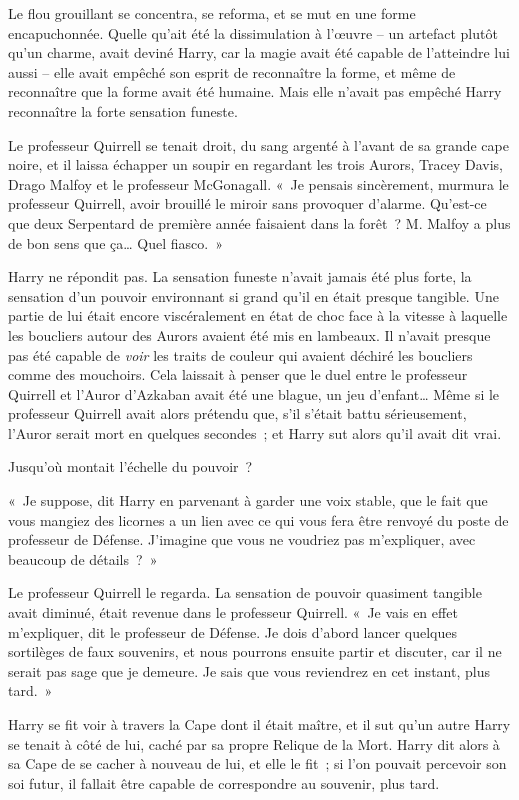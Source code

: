 Le flou grouillant se concentra, se reforma, et se mut en une forme encapuchonnée. Quelle qu'ait été la dissimulation à l'œuvre -- un artefact plutôt qu'un charme, avait deviné Harry, car la magie avait été capable de l'atteindre lui aussi -- elle avait empêché son esprit de reconnaître la forme, et même de reconnaître que la forme avait été humaine. Mais elle n'avait pas empêché Harry reconnaître la forte sensation funeste.

Le professeur Quirrell se tenait droit, du sang argenté à l'avant de sa grande cape noire, et il laissa échapper un soupir en regardant les trois Aurors, Tracey Davis, Drago Malfoy et le professeur McGonagall. «~Je pensais sincèrement, murmura le professeur Quirrell, avoir brouillé le miroir sans provoquer d'alarme. Qu'est-ce que deux Serpentard de première année faisaient dans la forêt~? M. Malfoy a plus de bon sens que ça… Quel fiasco.~»

Harry ne répondit pas. La sensation funeste n'avait jamais été plus forte, la sensation d'un pouvoir environnant si grand qu'il en était presque tangible. Une partie de lui était encore viscéralement en état de choc face à la vitesse à laquelle les boucliers autour des Aurors avaient été mis en lambeaux. Il n'avait presque pas été capable de \emph{voir} les traits de couleur qui avaient déchiré les boucliers comme des mouchoirs. Cela laissait à penser que le duel entre le professeur Quirrell et l'Auror d'Azkaban avait été une blague, un jeu d'enfant… Même si le professeur Quirrell avait alors prétendu que, s'il s'était battu sérieusement, l'Auror serait mort en quelques secondes~; et Harry sut alors qu'il avait dit vrai.

Jusqu'où montait l'échelle du pouvoir~?

«~Je suppose, dit Harry en parvenant à garder une voix stable, que le fait que vous mangiez des licornes a un lien avec ce qui vous fera être renvoyé du poste de professeur de Défense. J'imagine que vous ne voudriez pas m'expliquer, avec beaucoup de détails~?~»

Le professeur Quirrell le regarda. La sensation de pouvoir quasiment tangible avait diminué, était revenue dans le professeur Quirrell. «~Je vais en effet m'expliquer, dit le professeur de Défense. Je dois d'abord lancer quelques sortilèges de faux souvenirs, et nous pourrons ensuite partir et discuter, car il ne serait pas sage que je demeure. Je sais que vous reviendrez en cet instant, plus tard.~»

Harry se fit voir à travers la Cape dont il était maître, et il sut qu'un autre Harry se tenait à côté de lui, caché par sa propre Relique de la Mort. Harry dit alors à sa Cape de se cacher à nouveau de lui, et elle le fit~; si l'on pouvait percevoir son soi futur, il fallait être capable de correspondre au souvenir, plus tard.


